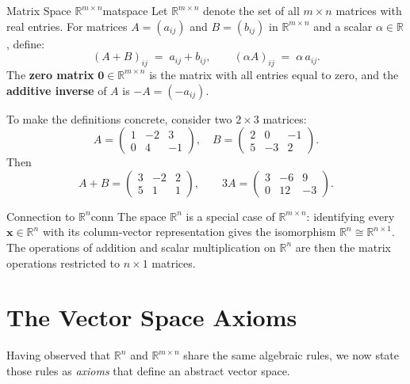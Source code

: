 \documentclass[12pt]{article}
\newcommand{\R}{\mathbb{R}}
\newcommand{\vv}[1]{\mathbf{#1}}
\newcommand{\vzero}{\mathbf{0}}
\begin{document}
	
	\begin{definition}{Matrix Space $\R^{m\times n}$}{matspace}
		Let $\R^{m\times n}$ denote the set of all $m \times n$ matrices with real entries.
		For matrices $A = (a_{ij})$ and $B = (b_{ij})$ in $\R^{m\times n}$ and a scalar
		$\alpha \in \R$, define:
		\[
		(A + B)_{ij} \;=\; a_{ij} + b_{ij},
		\qquad
		(\alpha A)_{ij} \;=\; \alpha\, a_{ij}.
		\]
		The \textbf{zero matrix} $\vzero \in \R^{m\times n}$ is the matrix with all entries
		equal to zero, and the \textbf{additive inverse} of $A$ is $-A = (-a_{ij})$.
	\end{definition}
	
	\noindent
	To make the definitions concrete, consider two $2\times 3$ matrices:
	\[
	A = \begin{pmatrix} 1 & -2 & 3 \\ 0 & 4 & -1 \end{pmatrix},
	\quad
	B = \begin{pmatrix} 2 & 0 & -1 \\ 5 & -3 & 2 \end{pmatrix}.
	\]
	Then
	\[
	A + B
	= \begin{pmatrix} 3 & -2 & 2 \\ 5 & 1 & 1 \end{pmatrix},
	\qquad
	3A
	= \begin{pmatrix} 3 & -6 & 9 \\ 0 & 12 & -3 \end{pmatrix}.
	\]
	
	\begin{remark}{Connection to $\R^n$}{conn}
		The space $\R^n$ is a special case of $\R^{m\times n}$: identifying every
		$\vv{x}\in\R^n$ with its column-vector representation gives the isomorphism
		$\R^n \cong \R^{n\times 1}$.  The operations of addition and scalar
		multiplication on $\R^n$ are then the matrix operations restricted to
		$n\times 1$ matrices.
	\end{remark}
	
	
	\section{The Vector Space Axioms}

	\noindent
	Having observed that $\R^n$ and $\R^{m\times n}$ share the same algebraic rules,
	we now state those rules as \emph{axioms} that define an abstract vector space.
	
\end{document}
